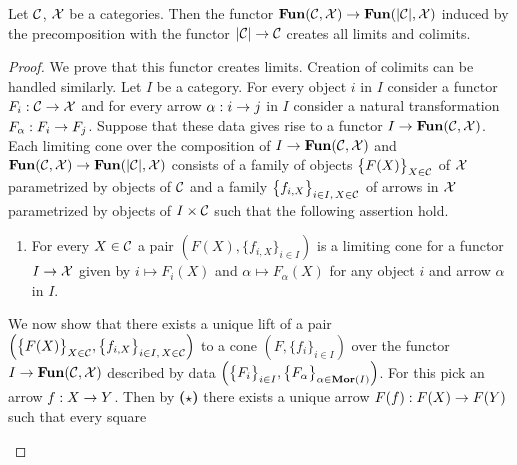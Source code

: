 \begin{theorem}\label{theorem:limitsinfunctorcategories}
Let ${\mathcal C}$, ${\mathcal X}$ be a categories. Then the functor $\mathbf{Fun}({\mathcal C},{\mathcal X})\rightarrow \mathbf{Fun}(|{\mathcal C}|,{\mathcal X})$ induced by the precomposition with the functor $|{\mathcal C}|\rightarrow {\mathcal C}$ creates all limits and colimits. 
\end{theorem}
\begin{proof}
We prove that this functor creates limits. Creation of colimits can be handled similarly. Let $I$ be a category. For every object $i$ in $I$ consider a functor $F_i:{\mathcal C}\rightarrow {\mathcal X}$ and for every arrow $\alpha:i\rightarrow j$ in $I$ consider a natural transformation $F_{\alpha}:F_i\rightarrow F_j$. Suppose that these data gives rise to a functor $I\rightarrow \mathbf{Fun}({\mathcal C},{\mathcal X})$. Each limiting cone over the composition of $I\rightarrow \mathbf{Fun}({\mathcal C},{\mathcal X})$ and $\mathbf{Fun}({\mathcal C},{\mathcal X})\rightarrow \mathbf{Fun}(|{\mathcal C}|,{\mathcal X})$ consists of a family of objects $\big\{F(X)\big\}_{X\in {\mathcal C}}$ of ${\mathcal X}$ parametrized by objects of ${\mathcal C}$ and a family $\big\{f_{i,X}\big\}_{i\in I,\,X\in {\mathcal C}}$ of arrows in ${\mathcal X}$ parametrized by objects of $I \times {\mathcal C}$ such that the following assertion hold.
\begin{enumerate}[label=\textbf{($\star$)}, leftmargin=1.5em]
\item For every $X\in {\mathcal C}$ a pair $\left(F(X),\big\{f_{i,X}\big\}_{i\in I}\right)$ is a limiting cone for a functor $I\rightarrow {\mathcal X}$ given by $i\mapsto F_i(X)$ and $\alpha\mapsto F_{\alpha}(X)$ for any object $i$ and arrow $\alpha$ in $I$.
\end{enumerate}
We now show that there exists a unique lift of a pair $\left(\big\{F(X)\big\}_{X\in {\mathcal C}},\big\{f_{i,X}\big\}_{i\in I,\,X\in {\mathcal C}}\right)$ to a cone $\left(F,\big\{f_i\big\}_{i\in I}\right)$ over the functor $I\rightarrow \mathbf{Fun}({\mathcal C},{\mathcal X})$ described by data $\left(\big\{F_i\big\}_{i\in I},\big\{F_{\alpha}\big\}_{\alpha \in \mathbf{Mor}(I)}\right)$. For this pick an arrow $f:X\rightarrow Y$. Then by \textbf{($\star$)} there exists a unique arrow $F(f):F(X)\rightarrow F(Y)$ such that every square
\begin{center}
\end{center}
\end{proof}
